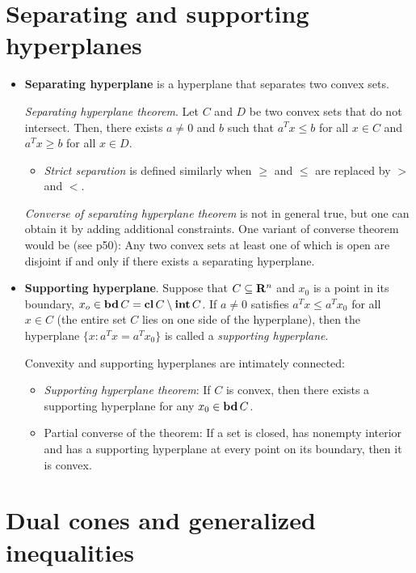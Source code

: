 \documentclass[a4paper, oneside]{book}
\begin{document}
\section{Separating and supporting hyperplanes}
\begin{itemize}
\item \textbf{Separating hyperplane} is a hyperplane that separates two convex sets.

\textit{Separating hyperplane theorem}. Let $C$ and $D$ be two convex sets that do not intersect. Then, there exists $a \neq 0$ and $b$ such that $a^T x \le b$ for all $x\in C$ and $a^T x \ge b$ for all $x \in D$.

	\begin{itemize}
	\item \textit{Strict separation} is defined similarly when $\ge$ and $\le$ are replaced by $>$ and $<$.
	\end{itemize}
\textit{Converse of separating hyperplane theorem} is not in general true, but one can obtain it by adding additional constraints. One variant of converse theorem would be (see p50): Any two convex sets at least one of which is open are disjoint if and only if there exists a separating hyperplane.

\item \textbf{Supporting hyperplane}. Suppose that $C \subseteq \mathbf R^n$ and $x_0$ is a point in its boundary, \ie $x_o \in \textbf{bd}\,C = \textbf{cl}\,C \setminus \textbf{int}\,C$. If $a\neq 0$ satisfies $a^T x \le a^T x_0$ for all $ x \in C$ (\ie the entire set $C$ lies on one side of the hyperplane), then the hyperplane $\{ x : a^T x = a^T x_0 \}$ is called a \textit{supporting hyperplane}.

Convexity and supporting hyperplanes are intimately connected:

	\begin{itemize}
	\item \textit{Supporting hyperplane theorem}: If $C$ is convex, then there exists a supporting hyperplane for any $x_0 \in \textbf{bd}\,C $.
	\item Partial converse of the theorem: If a set is closed, has nonempty interior and has a supporting hyperplane at every point on its boundary, then it is convex.
	\end{itemize}
\end{itemize}



\section{Dual cones and generalized inequalities}
\end{document}
